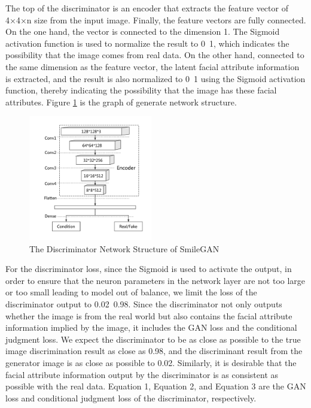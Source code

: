 The top of the discriminator is an encoder that extracts the feature vector of 4×4×n size from the input image.
Finally, the feature vectors are fully connected.
On the one hand, the vector is connected to the dimension 1.
The Sigmoid activation function is used to normalize the result to 0~1,
    which indicates the possibility that the image comes from real data.
On the other hand, connected to the same dimension as the feature vector,
    the latent facial attribute information is extracted,
    and the result is also normalized to 0~1 using the Sigmoid activation function,
    thereby indicating the possibility that the image has these facial attributes.
Figure \ref{net_discriminator} is the graph of generate network structure.

\begin{figure}
    \begin{center}
    \includegraphics[width=0.48\textwidth]{figures/net_discriminator.pdf}
    \caption{The Discriminator Network Structure of SmileGAN}
    \label{net_discriminator}
    \end{center}
\end{figure}

For the discriminator loss, since the Sigmoid is used to activate the output,
    in order to ensure that the neuron parameters in the network layer are not too large or too small leading to model out of balance,
    we limit the loss of the discriminator output to 0.02~0.98.
Since the discriminator not only outputs whether the image is from the real world but also contains the facial attribute information implied by the image,
    it includes the GAN loss and the conditional judgment loss.
We expect the discriminator to be as close as possible to the true image discrimination result as close as 0.98,
    and the discriminant result from the generator image is as close as possible to 0.02.
Similarly, it is desirable that the facial attribute information output by the discriminator is as consistent as possible with the real data.
Equation 1, Equation 2, and Equation 3 are the GAN loss and conditional judgment loss of the discriminator, respectively.

